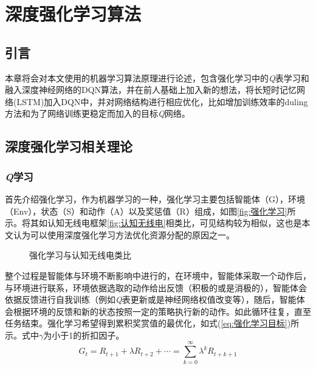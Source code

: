 \chapter{深度强化学习算法}
\section{引言}
本章将会对本文使用的机器学习算法原理进行论述，包含强化学习中的\textit{Q}表学习和融入深度神经网络的DQN算法，并在前人基础上加入新的想法，将长短时记忆网络(LSTM)加入DQN中，并对网络结构进行相应优化，比如增加训练效率的duling方法和为了网络训练更稳定而加入的目标\textit{Q}网络。
\section{深度强化学习相关理论}
\subsection{\textit{Q}学习}
首先介绍强化学习，作为机器学习的一种，强化学习主要包括智能体（G），环境（Env），状态（S）和动作（A）以及奖惩值（R）组成，如图\ref{fig:强化学习}所示。将其如认知无线电框架\ref{fig:认知无线电}相类比，可见结构较为相似，这也是本文认为可以使用深度强化学习方法优化资源分配的原因之一。
\begin{figure}[htbp]
	\begin{minipage}{\textwidth}
		\centering
		\subfigure{\label{fig:强化学习}}\addtocounter{subfigure}{-2}
		\hspace{1em}
		\subfigure{\label{fig:认知无线电}}\addtocounter{subfigure}{-2}
		\hspace{1em}	
	\end{minipage}
	\vspace{0.2em}
	\caption{强化学习与认知无线电类比}\label{fig:强化学习类比认知无线电}
\end{figure}

整个过程是智能体与环境不断影响中进行的，在环境中，智能体采取一个动作后，与环境进行联系，环境依据选取的动作给出反馈（积极的或是消极的），智能体会依据反馈进行自我训练（例如\textit{Q}表更新或是神经网络权值改变等），随后，智能体会根据环境的反馈和新的状态按照一定的策略执行新的动作。如此循环往复，直至任务结束。强化学习希望得到累积奖赏值的最优化，如式(\ref{eq:强化学习目标})所示。式中$\gamma$为小于1的折扣因子。
\begin{equation}\label{eq:强化学习目标}
G_{t}=R_{t+1}+\lambda R_{t+2}+\cdots=\sum_{k=0}^{\infty}\lambda^{k}R_{t+k+1}
\end{equation}

